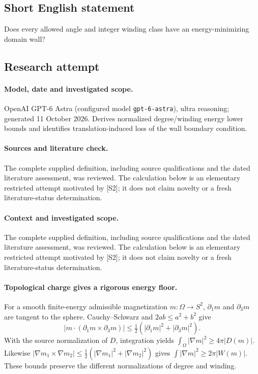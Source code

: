 \documentclass[11pt]{article}
\begin{document}
\subsection{Short English statement}
Does every allowed angle and integer winding class have an energy-minimizing domain wall?
\subsection{Research attempt}
\paragraph{Model, date and investigated scope.}
OpenAI GPT-6 Astra (configured model \texttt{gpt-6-astra}), ultra reasoning; generated 11 October 2026. Derives normalized degree/winding energy lower bounds and identifies translation-induced loss of the wall boundary condition.

\paragraph{Sources and literature check.}
The complete supplied definition, including source qualifications and the dated literature assessment, was reviewed. The calculation below is an elementary restricted attempt motivated by [S2]; it does not claim novelty or a fresh literature-status determination.

\paragraph{Context and investigated scope.} The complete supplied definition, including source qualifications and the dated literature assessment, was reviewed. The calculation below is an elementary restricted attempt motivated by [S2]; it does not claim novelty or a fresh literature-status determination.

\paragraph{Topological charge gives a rigorous energy floor.} For a smooth finite-energy admissible magnetization $m:\Omega\to S^2$, $\partial_1m$ and $\partial_3m$ are tangent to the sphere. Cauchy--Schwarz and $2ab\leq a^2+b^2$ give
\[
 |m\cdot(\partial_1m\times\partial_3m)|
 \leq\tfrac12(|\partial_1m|^2+|\partial_3m|^2).
\]
With the source normalization of $D$, integration yields $\int_\Omega|\nabla m|^2\geq4\pi|D(m)|$. Likewise $|\nabla m_1\times\nabla m_2|\leq\tfrac12(|\nabla m_1|^2+|\nabla m_2|^2)$ gives $\int|\nabla m|^2\geq2\pi|W(m)|$. These bounds preserve the different normalizations of degree and winding.
\end{document}
